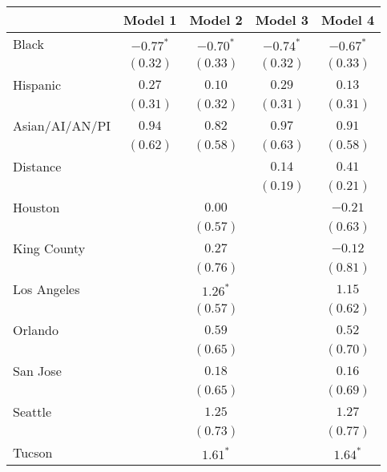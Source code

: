 
\begin{table}[ht!]
\begin{center}
\begin{tabular}{l c c c c}
\toprule
 & Model 1 & Model 2 & Model 3 & Model 4 \\
\midrule
Black          & $-0.77^{*}$ & $-0.70^{*}$ & $-0.74^{*}$ & $-0.67^{*}$ \\
               & $(0.32)$    & $(0.33)$    & $(0.32)$    & $(0.33)$    \\
Hispanic       & $0.27$      & $0.10$      & $0.29$      & $0.13$      \\
               & $(0.31)$    & $(0.32)$    & $(0.31)$    & $(0.31)$    \\
Asian/AI/AN/PI & $0.94$      & $0.82$      & $0.97$      & $0.91$      \\
               & $(0.62)$    & $(0.58)$    & $(0.63)$    & $(0.58)$    \\
Distance       &             &             & $0.14$      & $0.41$      \\
               &             &             & $(0.19)$    & $(0.21)$    \\
Houston        &             & $0.00$      &             & $-0.21$     \\
               &             & $(0.57)$    &             & $(0.63)$    \\
King County    &             & $0.27$      &             & $-0.12$     \\
               &             & $(0.76)$    &             & $(0.81)$    \\
Los Angeles    &             & $1.26^{*}$  &             & $1.15$      \\
               &             & $(0.57)$    &             & $(0.62)$    \\
Orlando        &             & $0.59$      &             & $0.52$      \\
               &             & $(0.65)$    &             & $(0.70)$    \\
San Jose       &             & $0.18$      &             & $0.16$      \\
               &             & $(0.65)$    &             & $(0.69)$    \\
Seattle        &             & $1.25$      &             & $1.27$      \\
               &             & $(0.73)$    &             & $(0.77)$    \\
Tucson         &             & $1.61^{*}$  &             & $1.64^{*}$  \\

\end{tabular}
\end{center}
\end{table}
